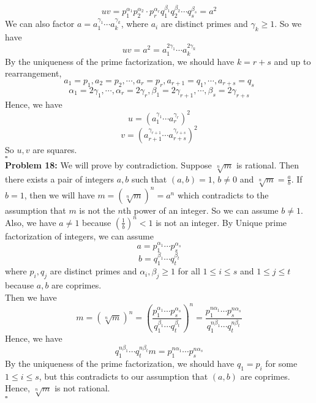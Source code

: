 \documentclass[12pt]{amsart}
\begin{document}
\[uv=p_1^{\alpha_1}p_2^{\alpha_2}\cdot p_r^{\alpha_r}q_1^{\beta_1}q_2^{\beta_2}\cdots q_s^{\beta_s}=a^2\]
We can also factor $a=a_1^{\gamma_1}\cdots a_k^{\gamma_k}$, where $a_i$ are distinct primes and $\gamma_k\geq1$. So we have 
\[uv=a^2=a_1^{2\gamma_1}\cdots a_k^{2\gamma_k}\] 
By the uniqueness of the prime factorization, we should have $k=r+s$ and up to rearrangement, 
\[a_1=p_1, a_2=p_2, \cdots, a_r=p_r, a_{r+1}=q_1, \cdots, a_{r+s}=q_s\]
\[\alpha_1=2\gamma_1,\cdots , \alpha_r=2\gamma_r, \beta_1=2\gamma_{r+1},\cdots , \beta_s=2\gamma_{r+s}\]
Hence, we have 
\[u=(a_1^{\gamma_1}\cdots a_r^{\gamma_r})^2\]
\[v=(a_{r+1}^{\gamma_{r+1}}\cdots a_{r+s}^{\gamma_{r+s}})^2\]
So $u,v$ are squares.
\\\phantom{qed}\hfill$\square$\\
\textbf{Problem 18:}
We will prove by contradiction. Suppose $\sqrt[n]{m}$ is rational. Then there exists a pair of integers $a,b$ such that $(a,b)=1$, $b\neq 0$ and $  \sqrt[n]{m}=\frac{a}{b}$. If $b=1$, then we will have $m=(\sqrt[n]{m})^n=a^n$ which contradicts to the assumption that $m$ is not the $n$th power of an integer. So we can assume $b\neq 1$. Also, we have $a\neq 1$ because $(\frac{1}{b})^n<1$ is not an integer. By Unique prime factorization of integers, we can assume 
\[a= p_1^{\alpha_1}\cdots p_s^{\alpha_s}\] 
\[b= q_1^{\beta_1}\cdots q_t^{\beta_t}\] 
where $p_i,q_j$ are distinct primes and $\alpha_i,\beta_j\geq 1$ for all $1\leq i \leq s $ and $ 1\leq j \leq t$ because $a,b$ are coprimes.\\
Then we have 
\[m=(\sqrt[n]{m})^n=(\frac{p_1^{\alpha_1}\cdots p_s^{\alpha_s}}{q_1^{\beta_1}\cdots q_t^{\beta_t}})^n=\frac{p_1^{n\alpha_1}\cdots p_s^{n\alpha_s}}{q_1^{n\beta_1}\cdots q_t^{n\beta_t}}\]
Hence, we have
\[q_1^{n\beta_1}\cdots q_t^{n\beta_t}m=p_1^{n\alpha_1}\cdots p_s^{n\alpha_s}\]
By the uniqueness of the prime factorization, we should have $q_1=p_i$ for some $1\leq i \leq s $, but this contradicts to our assumption that $(a,b)$ are coprimes. Hence, $\sqrt[n]{m}$ is not rational. 
\\\phantom{qed}\hfill$\square$\\
\end{document}
